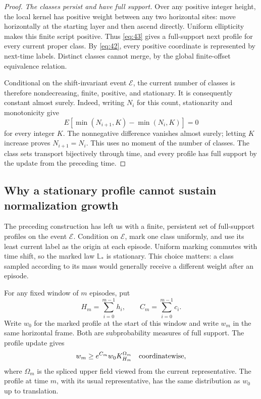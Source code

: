 \begin{proof}
\emph{The classes persist and have full support.}
Over any positive integer height, the local kernel has positive weight
between any two horizontal sites: move horizontally at the starting
layer and then ascend directly. Uniform ellipticity makes this finite
script positive. Thus \eqref{eq:43} gives a full-support next profile
for every current proper class. By \eqref{eq:42}, every positive
coordinate is represented by next-time labels. Distinct classes cannot
merge, by the global finite-offset equivalence relation.

Conditional on the shift-invariant event \(\mathcal E\), the current
number of classes is therefore nondecreasing, finite, positive, and
stationary. It is consequently constant almost surely. Indeed, writing $N_i$ for
this count, stationarity and monotonicity give
\[
 E[\min(N_{i+1},K)-\min(N_i,K)]=0
\]
for every integer $K$. The nonnegative difference vanishes almost
surely; letting $K$ increase proves $N_{i+1}=N_i$. This uses no moment
of the number of classes. The class sets transport bijectively
through time, and every profile has full support by the update from
the preceding time.
\end{proof}

\subsection{Why a stationary profile cannot sustain normalization growth}

The preceding construction has left us with a finite, persistent set of
full-support profiles on the event $\mathcal E$. Condition on
$\mathcal E$, mark one class uniformly, and use its least current label
as the origin at each episode. Uniform
marking commutes with time shift, so the marked law $\mathbb L_*$ is
stationary. This choice matters: a class sampled according to its mass
would generally receive a different weight after an episode.

For any fixed window of $m$ episodes, put
\[
 H_m=\sum_{i=0}^{m-1}h_i,\qquad C_m=\sum_{i=0}^{m-1}c_i.
\]
Write $w_0$ for the marked profile at the start of this window and write
$w_m$ in the same horizontal frame. Both are subprobability measures of
full support. The profile update gives
\[
 w_m\ge e^{C_m}w_0 K_{H_m}^{\Omega_m}
 \quad\hbox{coordinatewise},
\]
where $\Omega_m$ is the spliced upper field viewed from the current
representative. The profile at time $m$, with its usual representative,
has the same distribution as $w_0$ up to translation.

